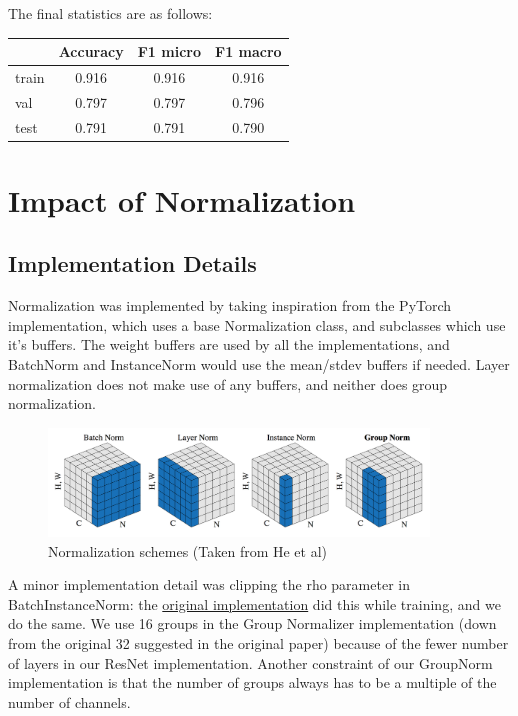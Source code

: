 \documentclass[12pt]{article}
\begin{document}
The final statistics are as follows:

\begin{center}
\begin{tabular}{|l|c|c|c|}
    \hline
    & Accuracy & F1 micro & F1 macro \\ 
    \hline
    train & 0.916 & 0.916 & 0.916 \\
    val & 0.797 & 0.797 & 0.796 \\
    test & 0.791 & 0.791 & 0.790 \\
    \hline
\end{tabular}
\end{center}

\section{Impact of Normalization}

\subsection{Implementation Details}
Normalization was implemented by taking inspiration from the PyTorch
implementation, which uses a base Normalization class, and subclasses which
use it's buffers. The weight buffers are used by all the implementations, and 
BatchNorm and InstanceNorm would use the mean/stdev buffers if needed. Layer
normalization does not make use of any buffers, and neither does group 
normalization.

\begin{center}
\begin{figure}[!htbp]
    \centering
    \includegraphics[width=0.9\textwidth]{norm_types.png}
    \caption{Normalization schemes (Taken from He et al)}
\end{figure}
\end{center}

A minor implementation detail was clipping the rho parameter in BatchInstanceNorm:
the \href{https://github.com/hyeonseobnam/Batch-Instance-Normalization/blob/master/main.py#L226}{original implementation} 
did this while training, and we do the same. We use 16 groups in the Group 
Normalizer implementation (down from the original 32 suggested in the original
paper) because of the fewer number of layers in our ResNet implementation.
Another constraint of our GroupNorm implementation is that the number of groups
always has to be a multiple of the number of channels.
\end{document}
